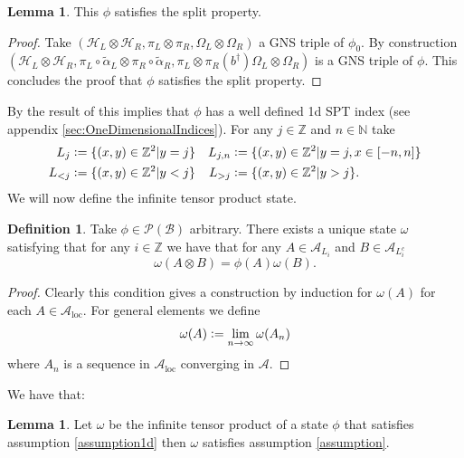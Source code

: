 \documentclass[12pt,a4paper,twoside]{article}
\newcommand{\defeq}{\vcentcolon=}
\newcommand{\BB}{\mathcal B}
\newcommand{\PP}{\mathcal P}
\newcommand{\HH}{\mathcal H}
\newcommand{\ZZ}{\mathbb Z}
\renewcommand{\AA}{\mathcal A}
\newcommand{\NN}{\mathbb{N}}
\theoremstyle{definition}
\newtheorem{definition}[theorem]{Definition}
\newtheorem{lemma}[theorem]{Lemma}
\numberwithin{equation}{section}
\begin{document}
\begin{lemma}\label{lem:phiExampleConsistentWithConjectureSplitProperty}
	This $\phi$ satisfies the split property.
\end{lemma}
\begin{proof}
	Take $(\HH_L\otimes\HH_R,\pi_L\otimes\pi_R,\Omega_L\otimes\Omega_R)$ a GNS triple of $\phi_0$. By construction $(\HH_L\otimes\HH_R,\pi_L\circ\tilde\alpha_L\otimes\pi_R\circ\tilde\alpha_R,\pi_L\otimes\pi_R(b^\dagger)\Omega_L\otimes\Omega_R)$ is a GNS triple of $\phi$. This concludes the proof that $\phi$ satisfies the split property.
\end{proof}
By the result of \cite{ogata2019classification} this implies that $\phi$ has a well defined 1d SPT index (see appendix \ref{sec:OneDimensionalIndices}). For any $j\in\ZZ$ and $n\in\NN$ take
\begin{align}
	L_j&\defeq \{(x,y)\in\ZZ^2|y=j\}&L_{j,n}&\defeq \{(x,y)\in\ZZ^2|y=j,x\in[-n,n]\}\\
	L_{<j}&\defeq \{(x,y)\in\ZZ^2|y<j\}&L_{>j}&\defeq \{(x,y)\in\ZZ^2|y>j\}.
\end{align}
We will now define the infinite tensor product state.
\begin{definition}\label{def:InfiniteTensorProductState}
	Take $\phi\in\PP(\BB)$ arbitrary. There exists a unique state $\omega$ satisfying that for any $i\in\ZZ$ we have that for any $A\in\AA_{L_i}$ and $B\in\AA_{L_i^c}$
	\begin{equation}
		\omega(A\otimes B)=\phi(A)\omega(B).
	\end{equation}
\end{definition}
\begin{proof}
	Clearly this condition gives a construction by induction for $\omega(A)$ for each $A\in\AA_{\text{loc}}$. For general elements we define
	\begin{equation}
		\omega(A)\defeq \lim_{n\rightarrow\infty}\omega(A_n)
	\end{equation}
	where $A_n$ is a sequence in $\AA_{\text{loc}}$ converging in $\AA$.
\end{proof}
We have that:
\begin{lemma}\label{lem:TensorProductStateHasWellDefinedH^2Index}
	Let $\omega$ be the infinite tensor product of a state $\phi$ that satisfies assumption \ref{assumption1d} then $\omega$ satisfies assumption \ref{assumption}.
\end{lemma}
\end{document}
